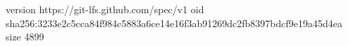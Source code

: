 version https://git-lfs.github.com/spec/v1
oid sha256:3233e2c5cca84f984c5883a6ce14e16f3ab91269dc2fb8397bdcf9e19a45d4ea
size 4899
